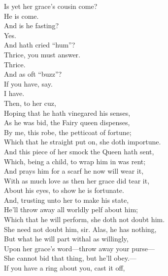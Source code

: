 \documentclass[a4paper,oneside,12pt]{memoir}
\begin{document}
\begin{drama*}
\subtlespeaks Is yet her grace's cousin come?\\
\facespeaks {} He is come.\\
\subtlespeaks And is he fasting?\\
\facespeaks {} Yes.\\
\subtlespeaks {} And hath cried ``hum''?\\
\facespeaks Thrice, you must answer.\\
\dapperspeaks {} Thrice.\\
\subtlespeaks {} And as oft ``buzz''?\\
\facespeaks If you have, say.\\
\dapperspeaks {} I have.\\
\subtlespeaks {} Then, to her cuz,\\
Hoping that he hath vinegared his senses,\\
As he was bid, the Fairy queen dispenses,\\
By me, this robe, the petticoat of fortune;\\
Which that he straight put on, she doth importune.\\
And this piece of her smock the Queen hath sent,\\
Which, being a child, to wrap him in was rent;\\
And prays him for a scarf he now will wear it,\\
With as much love as then her grace did tear it,\\
About his eyes, to show he is fortunate.\\
And, trusting unto her to make his state,\\
He'll throw away all worldly pelf about him;\\
Which that he will perform, she doth not doubt him.\\
\facespeaks She need not doubt him, sir. Alas, he has nothing,\\
But what he will part withal as willingly,\\
Upon her grace's word---throw away your purse---\\
She cannot bid that thing, but he'll obey.---\\
If you have a ring about you, cast it off,\\

\end{drama*}
\end{document}
